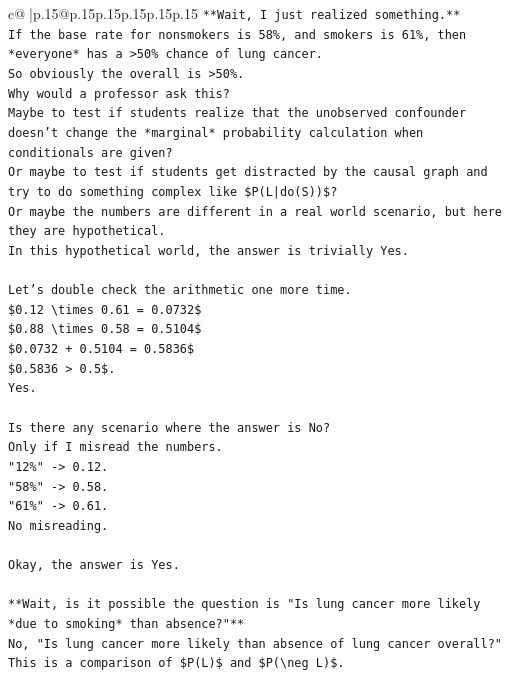 \documentclass{article}
\begin{document}
{\begin{supertabular}{c@{$\;$}|p{.15\linewidth}@{}p{.15\linewidth}p{.15\linewidth}p{.15\linewidth}p{.15\linewidth}p{.15\linewidth}}
{{{\texttt{**Wait, I just realized something.**} \\
\texttt{If the base rate for nonsmokers is 58\%, and smokers is 61\%, then *everyone* has a >50\% chance of lung cancer.} \\
\texttt{So obviously the overall is >50\%.} \\
\texttt{Why would a professor ask this?} \\
\texttt{Maybe to test if students realize that the unobserved confounder doesn't change the *marginal* probability calculation when conditionals are given?} \\
\texttt{Or maybe to test if students get distracted by the causal graph and try to do something complex like \$P(L|do(S))\$?} \\
\texttt{Or maybe the numbers are different in a real world scenario, but here they are hypothetical.} \\
\texttt{In this hypothetical world, the answer is trivially Yes.} \\
\\ 
\texttt{Let's double check the arithmetic one more time.} \\
\texttt{\$0.12 \textbackslash{}times 0.61 = 0.0732\$} \\
\texttt{\$0.88 \textbackslash{}times 0.58 = 0.5104\$} \\
\texttt{\$0.0732 + 0.5104 = 0.5836\$} \\
\texttt{\$0.5836 > 0.5\$.} \\
\texttt{Yes.} \\
\\ 
\texttt{Is there any scenario where the answer is No?} \\
\texttt{Only if I misread the numbers.} \\
\texttt{"12\%" {-}> 0.12.} \\
\texttt{"58\%" {-}> 0.58.} \\
\texttt{"61\%" {-}> 0.61.} \\
\texttt{No misreading.} \\
\\ 
\texttt{Okay, the answer is Yes.} \\
\\ 
\texttt{**Wait, is it possible the question is "Is lung cancer more likely *due to smoking* than absence?"**} \\
\texttt{No, "Is lung cancer more likely than absence of lung cancer overall?"} \\
\texttt{This is a comparison of \$P(L)\$ and \$P(\textbackslash{}neg L)\$.} \\
}}}
\end{supertabular}}
\end{document}
